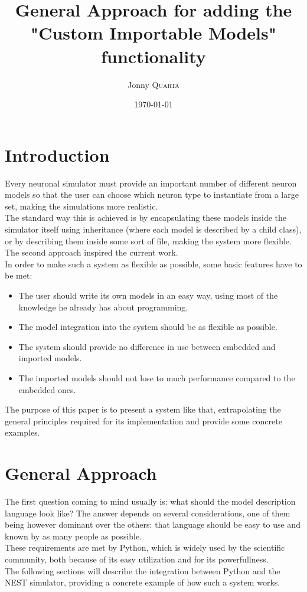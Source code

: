 \documentclass{article}
\title{General Approach for adding the \\ "Custom Importable Models" \\functionality} %
\author{Jonny \textsc{Quarta}} %
\date{\today} %
\begin{document}
\maketitle %


\setlength\parindent{0pt} %

\renewcommand{\labelenumi}{\alph{enumi}.} %



\section{Introduction}
Every neuronal simulator must provide an important number of different neuron models so that the user can choose which neuron type to instantiate from a large set, making the simulations more realistic. \\
The standard way this is achieved is by encapsulating these models inside the simulator itself using inheritance (where each model is described by a child class), or by describing them inside some sort of file, making the system more flexible. The second approach inspired the current work.\\
In order to make such a system as flexible as possible, some basic features have to be met:
\begin{itemize}
\item The user should write its own models in an easy way, using most of the knowledge he already has about programming.
\item The model integration into the system should be as flexible as possible.
\item The system should provide no difference in use between embedded and imported models.
\item The imported models should not lose to much performance compared to the embedded ones.
\end{itemize}
The purpose of this paper is to present a system like that, extrapolating the general principles required for its implementation and provide some concrete examples. \\



\section{General Approach}
The first question coming to mind usually is: what should the model description language look like?
The answer depends on several considerations, one of them being however dominant over the others: that language should be easy to use and known by as many people as possible. \\
These requirements are met by Python, which is widely used by the scientific community, both because of its easy utilization and for its powerfullness. \\
The following sections will describe the integration between Python and the NEST simulator, providing a concrete example of how such a system works. \\ \\
\end{document}
